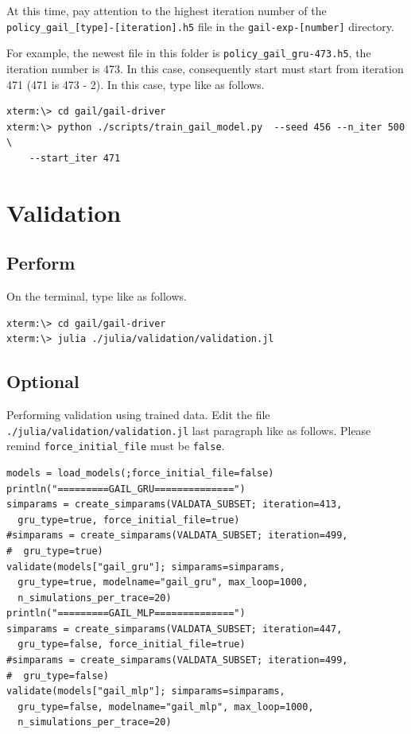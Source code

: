 \documentclass[openany,11pt]{report}%
\begin{document}
At this time, pay attention to the highest iteration number of the {\tt policy\_gail\_[type]-[iteration].h5} file in the {\tt gail-exp-[number]} directory.

For example, the newest file in this folder is {\tt policy\_gail\_gru-473.h5}, the iteration number is 473.
In this case, consequently start must start from iteration 471 (471 is 473 - 2).
In this case, type like as follows.

\begin{lstlisting}[style=DOS]
xterm:\> cd gail/gail-driver
xterm:\> python ./scripts/train_gail_model.py  --seed 456 --n_iter 500 \
    --start_iter 471
\end{lstlisting}





\section{Validation}

\subsection{Perform}

On the terminal, type like as follows.

\begin{lstlisting}[style=DOS]
xterm:\> cd gail/gail-driver
xterm:\> julia ./julia/validation/validation.jl
\end{lstlisting}

\subsection{Optional}

Performing validation using trained data.
Edit the file {\tt ./julia/validation/validation.jl} last paragraph like as follows.
Please remind {\tt force\_initial\_file} must be {\tt false}. 

\begin{lstlisting}[style=DOS]
models = load_models(;force_initial_file=false) 
println("=========GAIL_GRU==============")
simparams = create_simparams(VALDATA_SUBSET; iteration=413, 
  gru_type=true, force_initial_file=true)
#simparams = create_simparams(VALDATA_SUBSET; iteration=499,
#  gru_type=true)
validate(models["gail_gru"]; simparams=simparams, 
  gru_type=true, modelname="gail_gru", max_loop=1000,  
  n_simulations_per_trace=20)
println("=========GAIL_MLP==============")
simparams = create_simparams(VALDATA_SUBSET; iteration=447, 
  gru_type=false, force_initial_file=true)
#simparams = create_simparams(VALDATA_SUBSET; iteration=499, 
#  gru_type=false)
validate(models["gail_mlp"]; simparams=simparams, 
  gru_type=false, modelname="gail_mlp", max_loop=1000, 
  n_simulations_per_trace=20)
\end{lstlisting}
\end{document}
